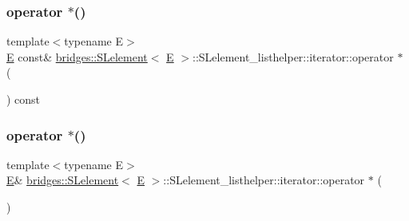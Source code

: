 \subsubsection{\texorpdfstring{operator $\ast$()}{operator *()}\hspace{0.1cm}{\footnotesize\ttfamily [1/2]}}
{\footnotesize\ttfamily template$<$typename E$>$ \\
\mbox{\hyperlink{namespacebridges_acfb0a4f7877d8f63de3e6862004c50eda3a3ea00cfc35332cedf6e5e9a32e94da}{E}} const\& \mbox{\hyperlink{classbridges_1_1_s_lelement}{bridges\+::\+S\+Lelement}}$<$ \mbox{\hyperlink{namespacebridges_acfb0a4f7877d8f63de3e6862004c50eda3a3ea00cfc35332cedf6e5e9a32e94da}{E}} $>$\+::S\+Lelement\+\_\+listhelper\+::iterator\+::operator $\ast$ (\begin{DoxyParamCaption}{ }\end{DoxyParamCaption}) const\hspace{0.3cm}{\ttfamily [inline]}}

\mbox{\label{classbridges_1_1_s_lelement_1_1_s_lelement__listhelper_1_1iterator_ae679bf8be1198cfa66452939812f12ca}} 
\subsubsection{\texorpdfstring{operator $\ast$()}{operator *()}\hspace{0.1cm}{\footnotesize\ttfamily [2/2]}}
{\footnotesize\ttfamily template$<$typename E$>$ \\
\mbox{\hyperlink{namespacebridges_acfb0a4f7877d8f63de3e6862004c50eda3a3ea00cfc35332cedf6e5e9a32e94da}{E}}\& \mbox{\hyperlink{classbridges_1_1_s_lelement}{bridges\+::\+S\+Lelement}}$<$ \mbox{\hyperlink{namespacebridges_acfb0a4f7877d8f63de3e6862004c50eda3a3ea00cfc35332cedf6e5e9a32e94da}{E}} $>$\+::S\+Lelement\+\_\+listhelper\+::iterator\+::operator $\ast$ (\begin{DoxyParamCaption}{ }\end{DoxyParamCaption})\hspace{0.3cm}{\ttfamily [inline]}}

\mbox{\label{classbridges_1_1_s_lelement_1_1_s_lelement__listhelper_1_1iterator_ac39a33029eb4ebbed3d0992a9fda1c9a}} 
